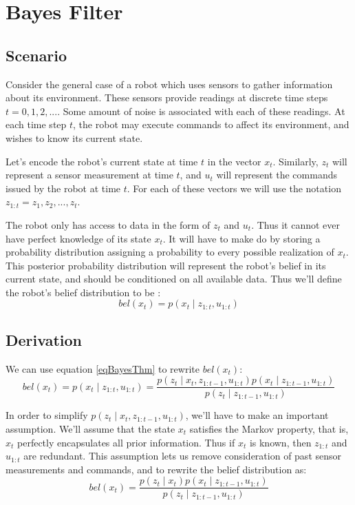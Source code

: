 \section{Bayes Filter}
\subsection{Scenario}
Consider the general case of a robot which uses sensors to gather information about its environment. These sensors provide readings at discrete time steps \(t=0,1,2,...\). Some amount of noise is associated with each of these readings. At each time step \(t\), the robot may execute commands to affect its environment, and wishes to know its current state. \cite{probabilisticRobotics}

Let's encode the robot's current state at time \(t\) in the vector \(x_t\). Similarly, \(z_t\) will represent a sensor measurement at time \(t\), and \(u_t\) will represent the commands issued by the robot at time \(t\). For each of these vectors we will use the notation \(z_{1:t} = z_1, z_2, ..., z_t\). \cite{probabilisticRobotics}

The robot only has access to data in the form of \(z_t\) and \(u_t\). Thus it cannot ever have perfect knowledge of its state \(x_t\). It will have to make do by storing a probability distribution assigning a probability to every possible realization of \(x_t\). This posterior probability distribution will represent the robot's belief in its current state, and should be conditioned on all available data. Thus we'll define the robot's belief distribution to be \cite{probabilisticRobotics}:
\begin{equation} \label{eqBel}
bel(x_t) = p(x_t \mathbin{\vert} z_{1:t}, u_{1:t})
\end{equation}

\subsection{Derivation}

We can use equation \ref{eqBayesThm} to rewrite \(bel(x_t)\):
\begin{equation*}
bel(x_t) = p(x_t \mathbin{\vert} z_{1:t}, u_{1:t}) = \frac{p(z_t \mathbin{\vert} x_t, z_{1:t-1}, u_{1:t})p(x_t \mathbin{\vert} z_{1:t-1}, u_{1:t})}{p(z_t \mathbin{\vert} z_{1:t-1}, u_{1:t})}
\end{equation*}

In order to simplify \(p(z_t \mathbin{\vert} x_t, z_{1:t-1}, u_{1:t})\), we'll have to make an important assumption. We'll assume that the state \(x_t\) satisfies the Markov property, that is, \(x_t\) perfectly encapsulates all prior information. Thus if \(x_t\) is known, then \(z_{1:t}\) and \(u_{1:t}\) are redundant. This assumption lets us remove consideration of past sensor measurements and commands, and to rewrite the belief distribution as:
\begin{equation*}
bel(x_t) = \frac{p(z_t \mathbin{\vert} x_t)p(x_t \mathbin{\vert} z_{1:t-1}, u_{1:t})}{p(z_t \mathbin{\vert} z_{1:t-1}, u_{1:t})}
\end{equation*}

